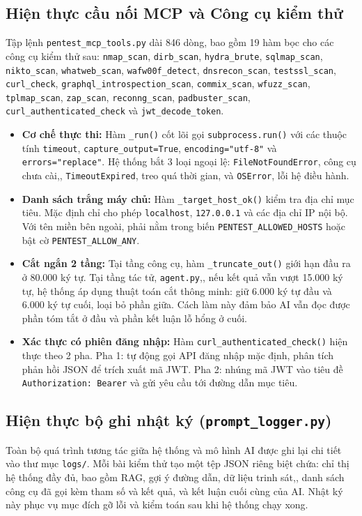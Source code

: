 \subsection{Hiện thực cầu nối MCP và Công cụ kiểm thử}
Tập lệnh \texttt{pentest\_mcp\_tools.py} dài 846 dòng, bao gồm 19 hàm bọc cho các công cụ kiểm thử sau: \texttt{nmap\_scan}, \texttt{dirb\_scan}, \texttt{hydra\_brute}, \texttt{sqlmap\_scan}, \texttt{nikto\_scan}, \texttt{whatweb\_scan}, \texttt{wafw00f\_detect}, \texttt{dnsrecon\_scan}, \texttt{testssl\_scan}, \texttt{curl\_check}, \texttt{graphql\_introspection\_scan}, \texttt{commix\_scan}, \texttt{wfuzz\_scan}, \texttt{tplmap\_scan}, \texttt{zap\_scan}, \texttt{reconng\_scan}, \texttt{padbuster\_scan}, \texttt{curl\_authenticated\_check} và \texttt{jwt\_decode\_token}.
\begin{itemize}
    \item \textbf{Cơ chế thực thi:} Hàm \texttt{\_run()} cốt lõi gọi \texttt{subprocess.run()} với các thuộc tính \texttt{timeout}, \texttt{capture\_output=True}, \texttt{encoding="utf-8"} và \texttt{errors="replace"}. Hệ thống bắt 3 loại ngoại lệ: \texttt{FileNotFoundError}, công cụ chưa cài,, \texttt{TimeoutExpired}, treo quá thời gian, và \texttt{OSError}, lỗi hệ điều hành.
    \item \textbf{Danh sách trắng máy chủ:} Hàm \texttt{\_target\_host\_ok()} kiểm tra địa chỉ mục tiêu. Mặc định chỉ cho phép \texttt{localhost}, \texttt{127.0.0.1} và các địa chỉ IP nội bộ. Với tên miền bên ngoài, phải nằm trong biến \texttt{PENTEST\_ALLOWED\_HOSTS} hoặc bật cờ \texttt{PENTEST\_ALLOW\_ANY}.
    \item \textbf{Cắt ngắn 2 tầng:} Tại tầng công cụ, hàm \texttt{\_truncate\_out()} giới hạn đầu ra ở 80.000 ký tự. Tại tầng tác tử, \texttt{agent.py},, nếu kết quả vẫn vượt 15.000 ký tự, hệ thống áp dụng thuật toán cắt thông minh: giữ 6.000 ký tự đầu và 6.000 ký tự cuối, loại bỏ phần giữa. Cách làm này đảm bảo AI vẫn đọc được phần tóm tắt ở đầu và phần kết luận lỗ hổng ở cuối.
    \item \textbf{Xác thực có phiên đăng nhập:} Hàm \texttt{curl\_authenticated\_check()} hiện thực theo 2 pha. Pha 1: tự động gọi API đăng nhập mặc định, phân tích phản hồi JSON để trích xuất mã JWT. Pha 2: nhúng mã JWT vào tiêu đề \texttt{Authorization: Bearer} và gửi yêu cầu tới đường dẫn mục tiêu.
\end{itemize}

\subsection{Hiện thực bộ ghi nhật ký (\texttt{prompt\_logger.py})}
Toàn bộ quá trình tương tác giữa hệ thống và mô hình AI được ghi lại chi tiết vào thư mục \texttt{logs/}. Mỗi bài kiểm thử tạo một tệp JSON riêng biệt chứa: chỉ thị hệ thống đầy đủ, bao gồm RAG, gợi ý đường dẫn, dữ liệu trinh sát,, danh sách công cụ đã gọi kèm tham số và kết quả, và kết luận cuối cùng của AI. Nhật ký này phục vụ mục đích gỡ lỗi và kiểm toán sau khi hệ thống chạy xong.


